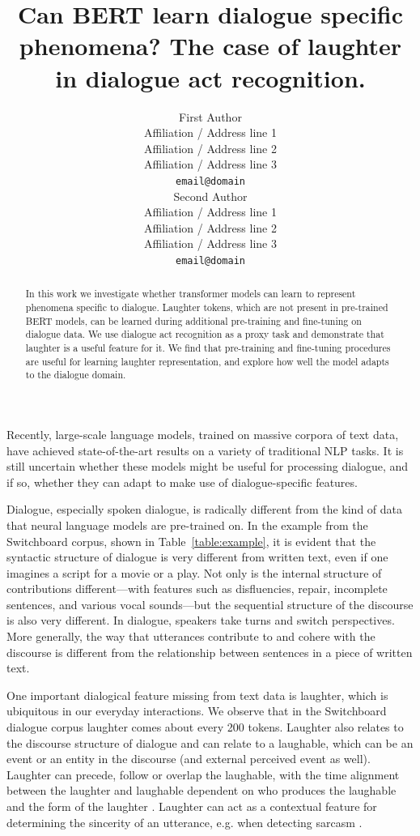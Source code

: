 \documentclass[11pt,a4paper]{article}
\title{Can BERT learn dialogue specific phenomena? The case of laughter in dialogue act recognition. }
\author{First Author \\
  Affiliation / Address line 1 \\
  Affiliation / Address line 2 \\
  Affiliation / Address line 3 \\
  \texttt{email@domain} \\\And
  Second Author \\
  Affiliation / Address line 1 \\
  Affiliation / Address line 2 \\
  Affiliation / Address line 3 \\
  \texttt{email@domain} \\}
\date{}
\begin{document}
\maketitle
\begin{abstract}
   In this work we investigate whether transformer models can learn to represent phenomena specific to dialogue.
   Laughter tokens, which are not present in pre-trained BERT models, can be learned during additional pre-training and fine-tuning on dialogue data. 
   We use dialogue act recognition as a proxy task and demonstrate that laughter is a useful feature for it.
   We find that pre-training and fine-tuning procedures are useful for learning laughter representation, and explore how well the model adapts to the dialogue domain.
\end{abstract}


Recently, large-scale language models, trained on massive corpora of text data, have achieved state-of-the-art results on a variety of traditional NLP tasks.
It is still uncertain whether these models might be useful for processing dialogue, and if so, whether they can adapt to make use of dialogue-specific features.

Dialogue, especially spoken dialogue, is radically different from the kind of data that neural language models are pre-trained on.
In the example from the Switchboard corpus, shown in Table~\ref{table:example}, it is evident that the syntactic structure of dialogue is very different from  written text, even if one imagines a script for a movie or a play.
Not only is the internal structure of contributions different---with features such as disfluencies, repair, incomplete sentences, and various vocal sounds---but the sequential structure of the discourse is also very different.
In dialogue, speakers take turns and switch perspectives.
More generally, the way that utterances contribute to and cohere with the discourse is different from the relationship between sentences in a piece of written text.

One important dialogical feature missing from text data is laughter, which is ubiquitous in our everyday interactions.
We observe that in the Switchboard dialogue corpus laughter comes about every 200 tokens.
Laughter also relates to the discourse structure of dialogue and can relate to a laughable, which can be an event or an entity in the discourse (and external perceived event as well).
Laughter can precede, follow or overlap the laughable, with the time alignment between the laughter and laughable dependent on who produces the laughable and the form of the laughter \citep{tian2016we}.
Laughter can act as a contextual feature for determining the sincerity of an utterance, e.g. when detecting sarcasm \citep{tepperman2006yeah}.
\end{document}
